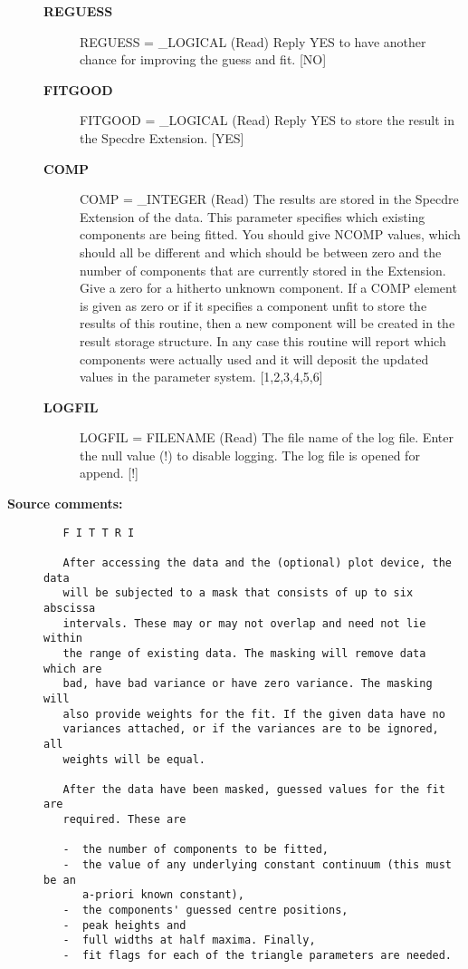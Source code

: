 \begin{description}
\begin{description}
\item [{\bf REGUESS}]
REGUESS = _LOGICAL (Read)
   Reply YES to have another chance for improving the guess and
   fit. [NO]
\item [{\bf FITGOOD}]
FITGOOD = _LOGICAL (Read)
   Reply YES to store the result in the Specdre Extension. [YES]
\item [{\bf COMP}]
COMP = _INTEGER (Read)
   The results are stored in the Specdre Extension of the data.
   This parameter specifies which existing components are being
   fitted. You should give NCOMP values, which should all be
   different and which should be between zero and the number of
   components that are currently stored in the Extension. Give a
   zero for a hitherto unknown component. If a COMP element is
   given as zero or if it specifies a component unfit to store the
   results of this routine, then a new component will be created
   in the result storage structure. In any case this routine will
   report which components were actually used and it will deposit
   the updated values in the parameter system. [1,2,3,4,5,6]
\item [{\bf LOGFIL}]
LOGFIL = FILENAME (Read)
   The file name of the log file. Enter the null value (!) to
   disable logging. The log file is opened for append. [!]

\end{description}

\item [{\bf Source comments:}]
\begin{verbatim}
   F I T T R I

   After accessing the data and the (optional) plot device, the data
   will be subjected to a mask that consists of up to six abscissa
   intervals. These may or may not overlap and need not lie within
   the range of existing data. The masking will remove data which are
   bad, have bad variance or have zero variance. The masking will
   also provide weights for the fit. If the given data have no
   variances attached, or if the variances are to be ignored, all
   weights will be equal.

   After the data have been masked, guessed values for the fit are
   required. These are

   -  the number of components to be fitted,
   -  the value of any underlying constant continuum (this must be an
      a-priori known constant),
   -  the components' guessed centre positions,
   -  peak heights and
   -  full widths at half maxima. Finally,
   -  fit flags for each of the triangle parameters are needed.


\end{verbatim}
\end{description}
